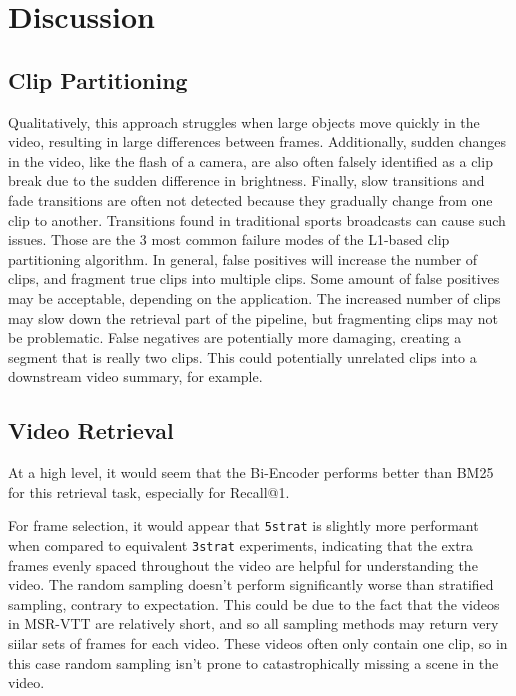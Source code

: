\section{Discussion}

\subsection{Clip Partitioning}

Qualitatively, this approach struggles when large objects move quickly in the video, resulting in large differences between frames.
Additionally, sudden changes in the video, like the flash of a camera, are also often falsely identified as a clip break due to the sudden difference in brightness.
Finally, slow transitions and fade transitions are often not detected because they gradually change from one clip to another.
Transitions found in traditional sports broadcasts can cause such issues.
Those are the 3 most common failure modes of the L1-based clip partitioning algorithm.
In general, false positives will increase the number of clips, and fragment true clips into multiple clips.
Some amount of false positives may be acceptable, depending on the application.
The increased number of clips may slow down the retrieval part of the pipeline, but fragmenting clips may not be problematic.
False negatives are potentially more damaging, creating a segment that is really two clips.
This could potentially unrelated clips into a downstream video summary, for example.

\subsection{Video Retrieval}

At a high level, it would seem that the Bi-Encoder performs better than BM25 for this retrieval task, especially for Recall@1.

For frame selection, it would appear that \verb|5strat| is slightly more performant when compared to equivalent \verb|3strat| experiments, indicating that the extra frames evenly spaced throughout the video are helpful for understanding the video.
The random sampling doesn't perform significantly worse than stratified sampling, contrary to expectation.
This could be due to the fact that the videos in MSR-VTT are relatively short, and so all sampling methods may return very siilar sets of frames for each video.
These videos often only contain one clip, so in this case random sampling isn't prone to catastrophically missing a scene in the video.

